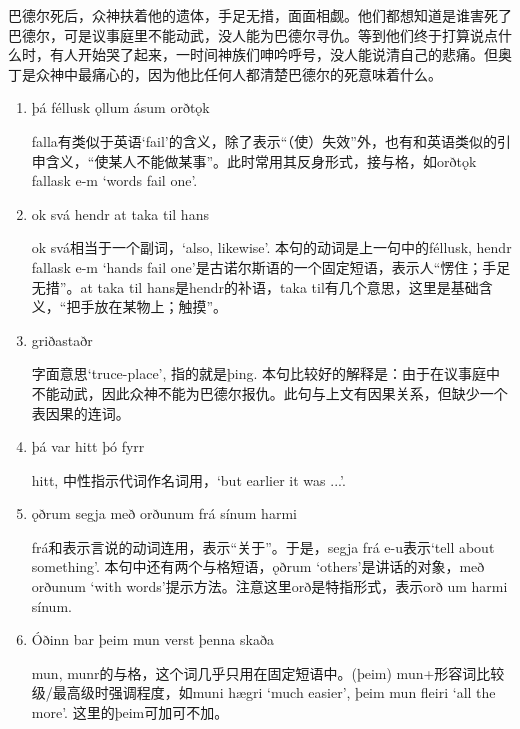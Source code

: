 \begin{translation*}{}
  巴德尔死后，众神扶着他的遗体，手足无措，面面相觑。他们都想知道是谁害死了巴德尔，可是议事庭里不能动武，没人能为巴德尔寻仇。等到他们终于打算说点什么时，有人开始哭了起来，一时间神族们呻吟呼号，没人能说清自己的悲痛。但奥丁是众神中最痛心的，因为他比任何人都清楚巴德尔的死意味着什么。
\end{translation*}
\begin{grammar*}{}
  \begin{enumerate}[leftmargin=*]
    \item þá féllusk ǫllum ásum orðtǫk

          falla有类似于英语`fail'的含义，除了表示“（使）失效”外，也有和英语类似的引申含义，“使某人不能做某事”。此时常用其反身形式，接与格，如orðtǫk fallask e-m `words fail one'.

    \item ok svá hendr at taka til hans

          ok svá相当于一个副词，`also, likewise'. 本句的动词是上一句中的féllusk, hendr fallask e-m `hands fail one'是古诺尔斯语的一个固定短语，表示人“愣住；手足无措”。at taka til hans是hendr的补语，taka til有几个意思，这里是基础含义，“把手放在某物上；触摸”。

    \item griðastaðr

          字面意思`truce-place', 指的就是þing. 本句比较好的解释是：由于在议事庭中不能动武，因此众神不能为巴德尔报仇。此句与上文有因果关系，但缺少一个表因果的连词。

    \item þá var hitt þó fyrr

          hitt, 中性指示代词作名词用，`but earlier it was ...'.

    \item ǫðrum segja með orðunum frá sínum harmi

          frá和表示言说的动词连用，表示“关于”。于是，segja frá e-u表示`tell about something'. 本句中还有两个与格短语，ǫðrum `others'是讲话的对象，með orðunum `with words'提示方法。注意这里orð是特指形式，表示orð um harmi sínum.

    \item Óðinn bar þeim mun verst þenna skaða

          mun, munr的与格，这个词几乎只用在固定短语中。(þeim) mun+形容词比较级/最高级时强调程度，如muni hægri `much easier', þeim mun fleiri `all the more'. 这里的þeim可加可不加。
  \end{enumerate}
\end{grammar*}
